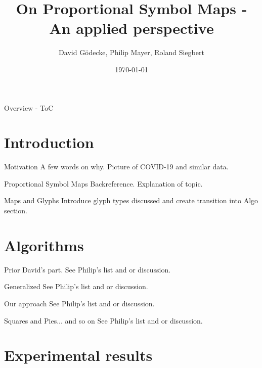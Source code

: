 \documentclass{beamer}
\title{On Proportional Symbol Maps - An applied perspective}
\date{\today}
\author{David Gödecke, Philip Mayer, Roland Siegbert}
\institute{Geometry Lab SS 2020}
\begin{document}
  \maketitle

  \begin{frame}{Overview - ToC}
    \tableofcontents
  \end{frame}

  \section{Introduction}

  \begin{frame}{Motivation}
    A few words on why.
    Picture of COVID-19 and similar data.
  \end{frame}

  \begin{frame}{Proportional Symbol Maps}
    Backreference.
    Explanation of topic.
  \end{frame}

  \begin{frame}{Maps and Glyphs}
    Introduce glyph types discussed and create transition into Algo section.
  \end{frame}

  \section{Algorithms}

  \begin{frame}{Prior}
    David's part. See Philip's list and or discussion.
  \end{frame}

  \begin{frame}{Generalized}
    See Philip's list and or discussion.
  \end{frame}

  \begin{frame}{Our approach}
    See Philip's list and or discussion.
  \end{frame}

  \begin{frame}{Squares and Pies... and so on}
    See Philip's list and or discussion.
  \end{frame}

  \section{Experimental results}
\end{document}

